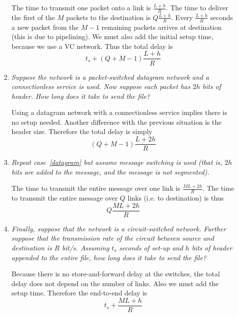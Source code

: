 \begin{enumerate}
\begin{enumerate}
        The time to transmit one packet onto a link is \(\frac{L +
          h}{R}\). The time to deliver the first of the \(M\) packets
        to the destination is \(Q{\frac{L+h}{R}}\). Every
        \(\frac{L+h}{R}\) seconds a new packet from the \(M-1\)
        remaining packets arrives at destination (this is due to
        pipelining). We must also add the initial setup time, because
        we use a VC network. Thus the total delay is
        \[
          t_{s} + (Q + M - 1){\frac{L+h}{R}}
        \]

      \item \label{datagram} \emph{Suppose the network is a
        packet-switched datagram network and a connectionless service
        is used. Now suppose each packet has \(2h\) bits of
        header. How long does it take to send the file?}

        Using a datagram network with a connectionless service implies
        there is no setup needed. Another difference with the previous
        situation is the header size. Therefore the total delay is
        simply
        \[
          (Q + M - 1){\frac{L + 2h}{R}}
        \]

      \item \emph{Repeat case~\ref{datagram} but assume message
        switching is used (that is, \(2h\) bits are added to the
        message, and the message is not segmented).}

        The time to transmit the entire message over one link is
        \(\frac{M L + 2h}{R}\). The time to transmit the entire
        message over \(Q\) links (i.e. to destination) is thus
        \[
          Q{\frac{M L + 2h}{R}}
        \]
 
      \item \emph{Finally, suppose that the network is a
        circuit-switched network. Further suppose that the
        transmission rate of the circuit between source and
        destination is \(R\) bit/s. Assuming \(t_s\) seconds of set-up
        and \(h\) bits of header appended to the entire file, how long
        does it take to send the file?}

        Because there is no store-and-forward delay at the switches,
        the total delay does not depend on the number of links. Also
        we must add the setup time. Therefore the end-to-end delay is
        \[
          t_{s} + \frac{M L + h}{R}
        \]

    \end{enumerate}


\end{enumerate}
